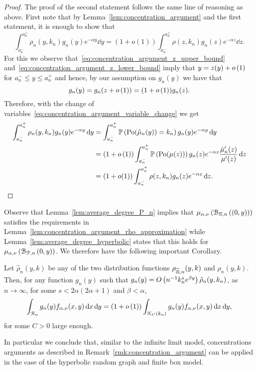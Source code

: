 \begin{proof}
The proof of the second statement follows the same line of reasoning as above. First note that by Lemma~\ref{lem:concentration_argument} and the first statement, it is enough to show that
\[
	\int_{a_n^-}^{a_n^+} \rho_n(y,k_n) g_n(y) e^{-\alpha y} \dd y
	= \left(1 + o(1)\right) \int_{a_n^-}^{a_n^+} \rho(z,k_n) g_n(z) e^{-\alpha z} \dd z.
\] 
For this we observe that~\eqref{eq:concentration_argument_z_upper_bound} and~\eqref{eq:concentration_argument_z_lower_bound} imply that $y = z(y) + o\left(1\right)$ for $a_n^- \le y \le a_n^+$ and hence, by our assumption on $g_n(y)$ we have that
\[
	g_n(y) = g_n(z + o\left(1\right)) = (1 + o\left(1\right))g_n(z).
\]
Therefore, with the change of variables~\eqref{eq:concentration_argument_variable_change} we get
\begin{align*}
	\int_{a_n^-}^{a_n^+} \rho_n(y,k_n) g_n(y) e^{-\alpha y} \operatorname{\mathrm{d}\hspace{-2pt}} y
	&=  \int_{a_n^-}^{a_n^+} \mathbb{P}\left({\mathrm{Po}}(\hat{\mu}_n(y)) = k_n\right) g_n(y) e^{-\alpha y} \operatorname{\mathrm{d}\hspace{-2pt}} y\\
	&= (1 + o\left(1\right))\int_{a_n^-}^{a_n^+}  \mathbb{P}\left({\mathrm{Po}}(\mu(z))\right)
		g_n(z) e^{-\alpha z} \frac{\hat{\mu}_n^\prime(z)}{\mu^{\prime}(z)} \operatorname{\mathrm{d}\hspace{-2pt}} z\\
	&= \left(1 + o(1)\right) \int_{a_n^-}^{a_n^+} \rho(z,k_n) g_n(z) e^{-\alpha z} \operatorname{\mathrm{d}\hspace{-2pt}} z.
\end{align*}

\end{proof}

Observe that Lemma~\ref{lem:average_degree_P_n} implies that $\mu_{\alpha,\nu}\left({\mathcal B}_{\mathbb{H},n}\left((0,y)\right)\right)$ satisfies the requirements in Lemma~\ref{lem:concentration_argument_rho_approximation} while Lemma~\ref{lem:average_degree_hyperbolic} states that this holds for $\mu_{\alpha,\nu}\left({\mathcal B}_{{\mathcal P},n}\left(0,y\right)\right)$. We therefore have the following important Corollary.

\begin{corollary}\label{cor:concentration_argument_other_models}
Let $\hat{\rho}_n(y,k)$ be any of the two distribution functions $\rho_{\widetilde{\mathbb{H}},n}(y,k)$ and $\rho_{n}(y,k)$. Then, for any function $g_n(y)$ such that $g_n(y) = O\left(n^{-1} k_n^{s} e^{\beta y}\right)\hat{\rho}_n(y,k_n)$, as $n \to \infty$, for some $s < 2\alpha(2\alpha + 1)$ and $\beta < \alpha$,
\[
	\int_{{\mathcal R}_n} g_n(y) f_{\alpha,\nu}(x,y) \operatorname{\mathrm{d}\hspace{-2pt}} x \operatorname{\mathrm{d}\hspace{-2pt}} y
	= (1+o\left(1\right))\int_{{\mathcal K}_C(k_n)} g_n(y) f_{\alpha,\nu}(x,y) \operatorname{\mathrm{d}\hspace{-2pt}} x \operatorname{\mathrm{d}\hspace{-2pt}} y,
\]
for some $C > 0$ large enough.
\end{corollary}

In particular we conclude that, similar to the infinite limit model, concentrations arguments as described in Remark~\ref{rmk:concentration_argument} can be applied in the case of the hyperbolic random graph and finite box model.


